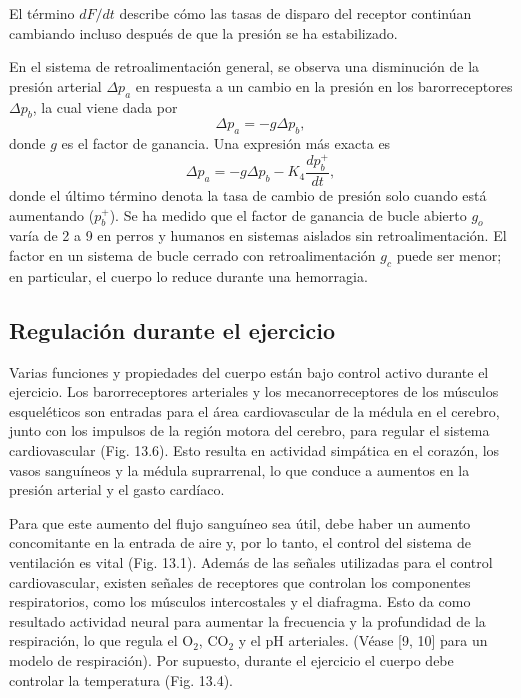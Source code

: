 \documentclass[12pt]{book}
\begin{document}
El término $dF/dt$ describe cómo las tasas de disparo del receptor continúan cambiando incluso después de que la presión se ha estabilizado.

En el sistema de retroalimentación general, se observa una disminución de la presión arterial $\Delta p_a$ en respuesta a un cambio en la presión en los barorreceptores $\Delta p_b$, la cual viene dada por
\begin{equation}
  \Delta p_a = -g \Delta p_b, \label{eq:13.35}
\end{equation}
donde $g$ es el factor de ganancia. Una expresión más exacta es
\begin{equation}
  \Delta p_a = -g \Delta p_b - K_4 \frac{dp_b^+}{dt}, \label{eq:13.36}
\end{equation}
donde el último término denota la tasa de cambio de presión solo cuando está aumentando ($p_b^+$). Se ha medido que el factor de ganancia de bucle abierto $g_o$ varía de 2 a 9 en perros y humanos en sistemas aislados sin retroalimentación. El factor en un sistema de bucle cerrado con retroalimentación $g_c$ puede ser menor; en particular, el cuerpo lo reduce durante una hemorragia.

\subsection{Regulación durante el ejercicio}
\label{subsec:13.2.3}

Varias funciones y propiedades del cuerpo están bajo control activo durante el ejercicio. Los barorreceptores arteriales y los mecanorreceptores de los músculos esqueléticos son entradas para el área cardiovascular de la médula en el cerebro, junto con los impulsos de la región motora del cerebro, para regular el sistema cardiovascular (Fig. 13.6). Esto resulta en actividad simpática en el corazón, los vasos sanguíneos y la médula suprarrenal, lo que conduce a aumentos en la presión arterial y el gasto cardíaco.

Para que este aumento del flujo sanguíneo sea útil, debe haber un aumento concomitante en la entrada de aire y, por lo tanto, el control del sistema de ventilación es vital (Fig. 13.1). Además de las señales utilizadas para el control cardiovascular, existen señales de receptores que controlan los componentes respiratorios, como los músculos intercostales y el diafragma. Esto da como resultado actividad neural para aumentar la frecuencia y la profundidad de la respiración, lo que regula el $\text{O}_2$, $\text{CO}_2$ y el pH arteriales. (Véase [9, 10] para un modelo de respiración). Por supuesto, durante el ejercicio el cuerpo debe controlar la temperatura (Fig. 13.4).
\end{document}
